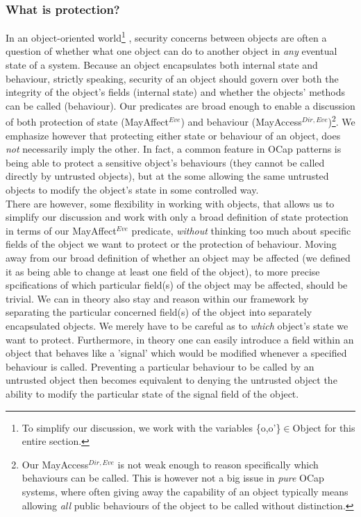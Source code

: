 \documentclass[a4paper,11pt, twoside,twocolumn]{article}
\newcommand{\loin}{$\in$}
\begin{document}
\subsubsection{What is protection?}
In an object-oriented world\footnote{
To simplify our discussion, we work with the variables \{o,o'\}\loin Object for this entire section.}
, security concerns between objects are often a question of whether what one object can do to another object in \textit{any} eventual state of a system. Because an object encapsulates both internal state and behaviour, strictly speaking, security of an object should govern over both the integrity of the object's fields (internal state) and whether the objects' methods can be called (behaviour). Our predicates are broad enough to enable a discussion of both protection of state (MayAffect$^{Eve}$) and behaviour (MayAccess$^{Dir,Eve}$)\footnote{ Our MayAccess$^{Dir,Eve}$ is not weak enough to reason specifically which behaviours can be called. This is however not a big issue in \textit{pure} OCap systems, where often giving away the capability of an object typically means allowing \textit{all} public behaviours of the object to be called without distinction.}. We emphasize however that protecting either state or behaviour of an object, does \textit{not} necessarily imply the other. In fact, a common feature in OCap patterns is being able to protect a sensitive object's behaviours (they cannot be called directly by untrusted objects), but at the some allowing the same untrusted objects to modify the object's state in some controlled way.\\

There are however, some flexibility in working with objects, that allows us to simplify our discussion and work with only a broad definition of state protection in terms of our MayAffect$^{Eve}$ predicate, \textit{without} thinking too much about specific fields of the object we want to protect or the protection of behaviour. Moving away from our broad definition of whether an object may be affected (we defined it as being able to change at least one field of the object), to more precise spcifications of which particular field(s) of the object may be affected, should be trivial. We can in theory also stay and reason within our framework by separating the particular concerned field(s) of the object into separately encapsulated objects. We merely have to be careful as to \textit{which} object's state we want to protect. Furthermore, in theory one can easily introduce a field within an object that behaves like a 'signal' which would be modified whenever a specified behaviour is called. Preventing a particular behaviour to be called by an untrusted object then becomes equivalent to denying the untrusted object the ability to modify the particular state of the signal field of the object.\\
\end{document}

